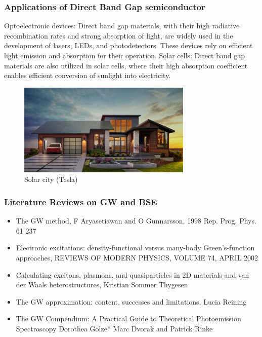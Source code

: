 \documentclass{CustomBeamer}
\begin{document}
            \begin{frame}
                \frametitle{Applications of Direct Band Gap semiconductor}
                \begin{itemize}
    Optoelectronic devices: Direct band gap materials, with their high radiative recombination rates and strong absorption of light, are widely used in the development of lasers, LEDs, and photodetectors. These devices rely on efficient light emission and absorption for their operation.
    Solar cells: Direct band gap materials are also utilized in solar cells, where their high absorption coefficient enables efficient conversion of sunlight into electricity.
            \end{itemize}
            \begin{figure}
                \centering
                \includegraphics[width=0.4\linewidth]{solarcity.png}
                \caption{Solar city (Tesla)            }
            \end{figure}
            \end{frame}
  
            \begin{frame}
                    \frametitle{Literature Reviews on GW and BSE}
                    \begin{itemize}
                        \item The GW method, F Aryasetiawan and O Gunnarsson, 1998 Rep. Prog. Phys. 61 237 
                        \item Electronic excitations: density-functional versus many-body Green’s-function approaches, REVIEWS OF MODERN PHYSICS, VOLUME 74, APRIL 2002 
                        \item Calculating excitons, plasmons, and quasiparticles in 2D materials and van der Waals heterostructures, Kristian Sommer Thygesen
                        \item The GW approximation: content, successes and limitations, Lucia Reining
                        \item The GW Compendium: A Practical Guide to Theoretical Photoemission Spectroscopy
                        Dorothea Golze* Marc Dvorak and Patrick Rinke %
                    \end{itemize}
                    \end{frame}
            
                
\end{document}
